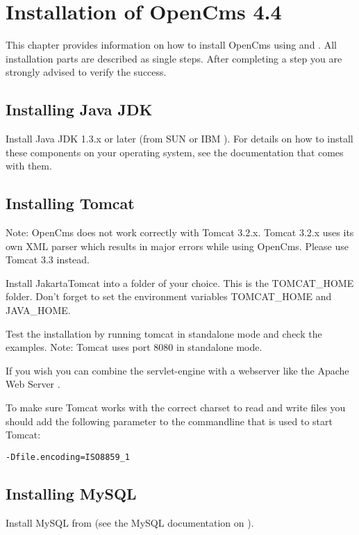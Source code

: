 \chapter{Installation of OpenCms 4.4}

This chapter provides information on how to install OpenCms using
 and
. All installation parts are
described as single steps. After completing a step you are
strongly advised to verify the success.

\section{Installing Java JDK}
Install Java JDK 1.3.x or later (from SUN
or IBM
).
For details on how to install these components on your operating
system, see the documentation that comes with them.

\section{Installing Tomcat}
Note: OpenCms does not work correctly with Tomcat 3.2.x. Tomcat
3.2.x uses its own XML parser which results in major errors while
using OpenCms. Please use Tomcat 3.3 instead.

Install JakartaTomcat
into a folder of your choice. This is the TOMCAT\_HOME folder.
Don't forget to set the environment variables TOMCAT\_HOME and
JAVA\_HOME.

Test the installation by running tomcat in standalone mode and
check the examples. Note: Tomcat uses port 8080 in standalone
mode.

If you wish you can combine the servlet-engine with a webserver
like the Apache Web Server
.

To make sure Tomcat works with the correct charset to read and
write files you should add the following parameter to the
commandline that is used to start Tomcat:

\texttt{-Dfile.encoding=ISO8859\_1}

\section{Installing MySQL}
Install MySQL from
(see the MySQL documentation on
).

